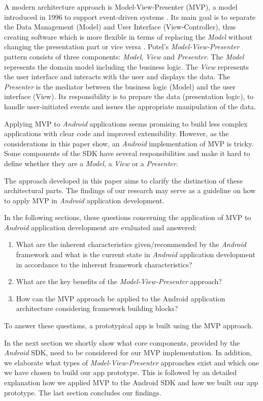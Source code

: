 
A modern architecture approach is Model-View-Presenter (MVP), a model introduced in 1996 to support event-driven systems \cite{TaligentMVP}. Its main goal is to separate the Data Management (Model) and User Interface (View-Controller), thus creating software which is more flexible in terms of replacing the \emph{Model} without changing the presentation part or vice versa \cite{PassiveMVC}.
Potel's \emph{Model-View-Presenter} pattern consists of three components: \emph{Model}, \emph{View} and \emph{Presenter}. The \emph{Model} represents the domain model including the business logic. The \emph{View} represents the user interface and interacts with the user and displays the data. The \emph{Presenter} is the mediator between the business logic (Model) and the user interface (View). Its responsibility is to prepare the data (presentation logic), to handle user-initiated events and issues the appropriate manipulation of the data.


Applying MVP to \emph{Android} applications seems promising to build less complex applications with clear code and improved extensibility. However, as the considerations in this paper show, an \emph{Android} implementation of MVP is tricky. Some components of the SDK have several responsibilities and make it hard to define whether they are a \emph{Model}, a \emph{View} or a \emph{Presenter}. 

The approach developed in this paper aims to clarify the distinction of these architectural parts. The findings of our research may serve as a guideline on how to apply MVP in \emph{Android} application development.


In the following sections, these questions concerning the application of MVP to \emph{Android} application development are evaluated and answered:

\begin{enumerate}[label={RQ\arabic*:}, leftmargin=0.95cm]
\item What are the inherent characteristics given/recommended by the \emph{Android} framework and what is the current state in \emph{Android} application development in accordance to the inherent framework characteristics?
\item What are the key benefits of the \emph{Model-View-Presenter} approach?
\item How can the MVP approach be applied to the Android application architecture considering framework building blocks?
\end{enumerate}

To answer these questions, a prototypical app is built using the MVP approach. 

In the next section we shortly show what core components, provided by the \emph{Android} SDK, need to be considered for our MVP implementation. In addition, we elaborate what types of \emph{Model-View-Presenter} approaches exist and which one we have chosen to build our app prototype. This is followed by an detailed explanation how we applied MVP to the Android SDK and how we built our app prototype. The last section concludes our findings.
